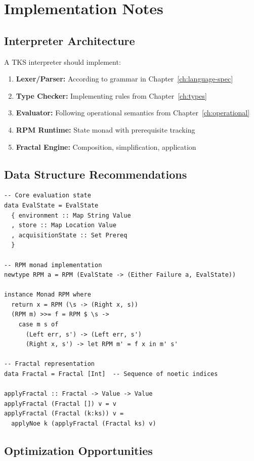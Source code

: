 \documentclass[11pt,twoside,openright]{book}
\theoremstyle{definition}
\theoremstyle{plain}
\theoremstyle{remark}
\begin{document}
\chapter{Implementation Notes}
\label{app:implementation}

\section{Interpreter Architecture}

A TKS interpreter should implement:

\begin{enumerate}
\item \textbf{Lexer/Parser:} According to grammar in Chapter~\ref{ch:language-spec}
\item \textbf{Type Checker:} Implementing rules from Chapter~\ref{ch:types}
\item \textbf{Evaluator:} Following operational semantics from Chapter~\ref{ch:operational}
\item \textbf{RPM Runtime:} State monad with prerequisite tracking
\item \textbf{Fractal Engine:} Composition, simplification, application
\end{enumerate}

\section{Data Structure Recommendations}

\begin{verbatim}
-- Core evaluation state
data EvalState = EvalState
  { environment :: Map String Value
  , store :: Map Location Value
  , acquisitionState :: Set Prereq
  }

-- RPM monad implementation
newtype RPM a = RPM (EvalState -> (Either Failure a, EvalState))

instance Monad RPM where
  return x = RPM (\s -> (Right x, s))
  (RPM m) >>= f = RPM $ \s ->
    case m s of
      (Left err, s') -> (Left err, s')
      (Right x, s') -> let RPM m' = f x in m' s'

-- Fractal representation
data Fractal = Fractal [Int]  -- Sequence of noetic indices

applyFractal :: Fractal -> Value -> Value
applyFractal (Fractal []) v = v
applyFractal (Fractal (k:ks)) v =
  applyNoe k (applyFractal (Fractal ks) v)
\end{verbatim}

\section{Optimization Opportunities}
\end{document}
